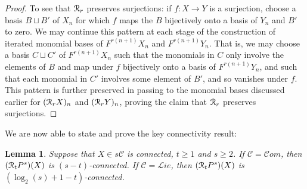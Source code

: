 \documentclass[11pt]{amsart}
\theoremstyle{plain}
\newtheorem{lem}[thm]{Lemma}
\theoremstyle{definition}
\renewcommand{\to}{\longrightarrow}
\newcommand{\scrL}{\mathscr{L}}
\newcommand{\scrC}{\mathscr{C}}
\newcommand{\calR}{\mathcal{R}}
\newcommand{\calC}{\mathcal{C}}
\theoremstyle{plain}
\newcommand{\LieOperad}{{\scrL}}
\newcommand{\algs}{{\scrC\!\textit{om}}}
\newcommand{\liealgs}{{\scrL\!\textit{ie}}}
\newcommand{\algcat}{{\calC}}%
\newcommand{\caldup}[1]{\calR_{\smash{#1}}}
\newcommand{\barConstructionMightAbbreviate}{b}
\begin{document}
\begin{BK spec seq}
\begin{connectivity}
\begin{proof}
To see that $\caldup{r}$ preserves surjections: if $f:X\to Y$ is a surjection, choose a basis $B\sqcup B'$ of $X_n$ for  which $f$ maps the $B$ bijectively onto a basis of $Y_n$ and $B'$ to zero. We may continue this pattern at each stage of the construction of iterated monomial bases of $F^{r(n+1)}X_n$ and $F^{r(n+1)}Y_n$. That is, we may choose a  basis $C\sqcup C'$ of $F^{r(n+1)}X_n$  such that the monomials in $C$ only involve the elements of $B$ and map under $f$ bijectively onto a basis of $F^{r(n+1)}Y_n$, and such that each monomial in $C'$ involves some element of $B'$, and so vanishes under $f$. This pattern is further preserved in passing to the monomial bases discussed earlier for $(\caldup{r}X)_n$ and $(\caldup{r}Y)_n$, proving the claim that $\caldup{r}$ preserves surjections. 
%
%
\end{proof}
We are now able to state and prove the key connectivity result:
\begin{lem}\label{connectivityOfDerivedPowers}
Suppose that $X\in s\algcat$ is connected, $t\geq1$ and $s\geq2$. If $\algcat=\algs$, then $(\caldup{t}P^{s})(X)$ is $(s-t)$-connected. If $\algcat=\liealgs$, then $(\caldup{t}P^{s})(X)$ is  $(\log_2(s)+1-t)$-connected.
\end{lem}

\end{connectivity}
\end{BK spec seq}
\end{document}
